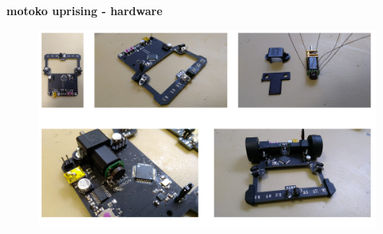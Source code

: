 \documentclass[xcolor=dvipsnames]{beamer}
\begin{document}
\begin{frame}{\bf motoko uprising - hardware}

\begin{figure}
  \includegraphics[scale=0.42]{../images/robot_mount_01.jpg}
\end{figure}

\end{frame}
\end{document}
